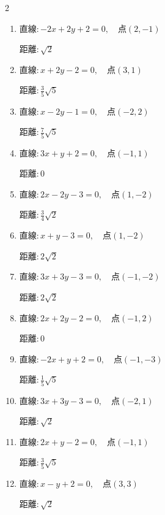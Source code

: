 \begin{multicols}{2}
\begin{enumerate}
        $\displaystyle 距離 : \frac{1}{2}\sqrt{2}$

  \item $直線:-2x+2y+2=0,\quad 点 ( 2, -1 )$

        $\displaystyle 距離 : \sqrt{2}$

  \item $直線:x+2y-2=0,\quad 点 ( 3, 1 )$

        $\displaystyle 距離 : \frac{3}{5}\sqrt{5}$

\columnbreak %

  \item $直線:x-2y-1=0,\quad 点 ( -2, 2 )$

        $\displaystyle 距離 : \frac{7}{5}\sqrt{5}$

  \item $直線:3x+y+2=0,\quad 点 ( -1, 1 )$

        $\displaystyle 距離 : 0$

  \item $直線:2x-2y-3=0,\quad 点 ( 1, -2 )$

        $\displaystyle 距離 : \frac{3}{4}\sqrt{2}$

  \item $直線:x+y-3=0,\quad 点 ( 1, -2 )$

        $\displaystyle 距離 : 2\sqrt{2}$

  \item $直線:3x+3y-3=0,\quad 点 ( -1, -2 )$

        $\displaystyle 距離 : 2\sqrt{2}$

  \item $直線:2x+2y-2=0,\quad 点 ( -1, 2 )$

        $\displaystyle 距離 : 0$

  \item $直線:-2x+y+2=0,\quad 点 ( -1, -3 )$

        $\displaystyle 距離 : \frac{1}{5}\sqrt{5}$

  \item $直線:3x+3y-3=0,\quad 点 ( -2, 1 )$

        $\displaystyle 距離 : \sqrt{2}$

  \item $直線:2x+y-2=0,\quad 点 ( -1, 1 )$

        $\displaystyle 距離 : \frac{3}{5}\sqrt{5}$

  \item $直線:x-y+2=0,\quad 点 ( 3, 3 )$

        $\displaystyle 距離 : \sqrt{2}$


\end{enumerate}
\end{multicols}
